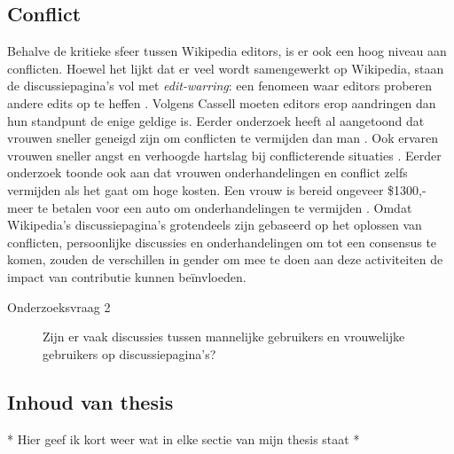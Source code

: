 \subsection{Conflict}
Behalve de kritieke sfeer tussen Wikipedia editors, is er ook een hoog niveau aan conflicten. Hoewel het lijkt dat er veel wordt samengewerkt op Wikipedia, staan de discussiepagina's vol met \textit{edit-warring}: een fenomeen waar editors proberen andere edits op te heffen \citep{cassell2011editwars}. Volgens Cassell moeten editors erop aandringen dan hun standpunt de enige geldige is. Eerder onderzoek heeft al aangetoond dat vrouwen sneller geneigd zijn om conflicten te vermijden dan man \citep{brewer2002gender}. Ook ervaren vrouwen sneller angst en verhoogde hartslag bij conflicterende situaties \citep{smith1998agency}. Eerder onderzoek toonde ook aan dat vrouwen onderhandelingen en conflict zelfs vermijden als het gaat om hoge kosten. Een vrouw is bereid ongeveer \$1300,- meer te betalen voor een auto om onderhandelingen te vermijden \citep{babcock2009women}. Omdat Wikipedia's discussiepagina's grotendeels zijn gebaseerd op het oplossen van conflicten, persoonlijke discussies en onderhandelingen om tot een consensus te komen, zouden de verschillen in gender om mee te doen aan deze activiteiten de impact van contributie kunnen be\"{i}nvloeden.
\begin{description}
\item[Onderzoeksvraag 2] Zijn er vaak discussies tussen mannelijke gebruikers en vrouwelijke gebruikers op discussiepagina's?
\end{description}





\subsection{Inhoud van thesis}
* Hier geef ik kort weer wat in elke sectie van mijn thesis staat *
